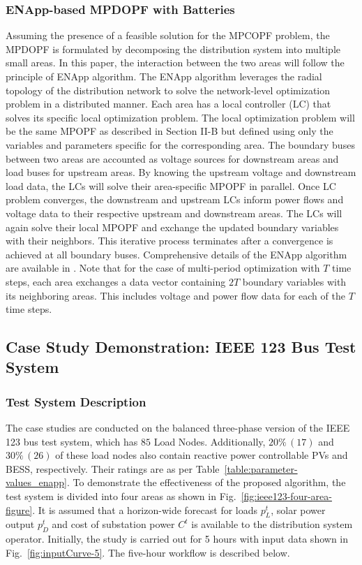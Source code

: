 \subsubsection{ENApp-based MPDOPF with Batteries} \label{subsec:ENApp}
Assuming the presence of a feasible solution for the MPCOPF problem, the MPDOPF is formulated by decomposing the distribution system into multiple small areas. In this paper, the interaction between the two areas will follow the principle of ENApp algorithm. The ENApp algorithm leverages the radial topology of the distribution network to solve the network-level optimization problem in a distributed manner. Each area has a local controller (LC) that solves its specific local optimization problem. The local optimization problem will be the same MPOPF as described in Section II-B but defined using only the variables and parameters specific for the corresponding area. The boundary buses between two areas are accounted as voltage sources for downstream areas and load buses for upstream areas. By knowing the upstream voltage and downstream load data, the LCs will solve their area-specific MPOPF in parallel. Once LC problem converges, the downstream and upstream LCs inform power flows and voltage data to their respective upstream and downstream areas. The LCs will again solve their local MPOPF and exchange the updated boundary variables with their neighbors. This iterative process terminates after a convergence is achieved at all boundary buses. Comprehensive details of the ENApp algorithm are available in \cite{Sadnan}. Note that for the case of multi-period optimization with $T$ time steps, each area exchanges a data vector containing $2T$ boundary variables with its neighboring areas. This includes voltage and power flow data for each of the $T$ time steps. 

\subsection{Case Study Demonstration: IEEE 123 Bus Test System}

\subsubsection{Test System Description}

The case studies are conducted on the balanced three-phase version of the IEEE 123 bus test system, which has $85$ Load Nodes. Additionally, $20 \% \, (17)$ and $30 \% \, (26)$ of these load nodes also contain reactive power controllable PVs and BESS, respectively. Their ratings are as per Table~\ref{table:parameter-values_enapp}. To demonstrate the effectiveness of the proposed algorithm, the test system is divided into four areas as shown in Fig.~\ref{fig:ieee123-four-area-figure}. It is assumed that a horizon-wide forecast for loads $p^t_L$, solar power output $p^t_D$ and cost of substation power  $C^t$ is available to the distribution system operator. Initially, the study is carried out for 5 hours with input data shown in Fig.~\ref{fig:inputCurve-5}. The five-hour workflow is described below. 

